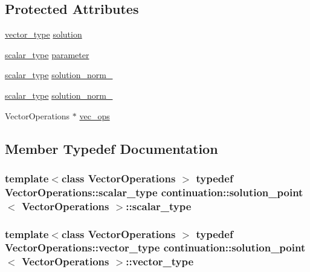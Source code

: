 \subsection*{Protected Attributes}
\begin{DoxyCompactItemize}
\item 
\hyperlink{classcontinuation_1_1solution__point_a6c3692e61ce44b2ac89223c0f6db2895}{vector\-\_\-type} \hyperlink{classcontinuation_1_1solution__point_a931d91bfd44bb22ca33adb05a53cd660}{solution}
\item 
\hyperlink{classcontinuation_1_1solution__point_aa3e601aeccb1c0fd6faebd835f1e92db}{scalar\-\_\-type} \hyperlink{classcontinuation_1_1solution__point_ab5c24bf3e77b6ad2128fb0829954003f}{parameter}
\item 
\hyperlink{classcontinuation_1_1solution__point_aa3e601aeccb1c0fd6faebd835f1e92db}{scalar\-\_\-type} \hyperlink{classcontinuation_1_1solution__point_a1273d8cd06c0249e3e2ed6c174125d35}{solution\-\_\-norm\-\_}
\item 
\hyperlink{classcontinuation_1_1solution__point_aa3e601aeccb1c0fd6faebd835f1e92db}{scalar\-\_\-type} \hyperlink{classcontinuation_1_1solution__point_a553c396c3e822fadec812e5add4d9580}{solution\-\_\-norm\-\_}
\item 
Vector\-Operations $\ast$ \hyperlink{classcontinuation_1_1solution__point_a624bdfc528e737f6baf4529dd61c2885}{vec\-\_\-ops}
\end{DoxyCompactItemize}


\subsection{Member Typedef Documentation}
\hypertarget{classcontinuation_1_1solution__point_aa3e601aeccb1c0fd6faebd835f1e92db}{
\subsubsection[{scalar\-\_\-type}]{\setlength{\rightskip}{0pt plus 5cm}template$<$class Vector\-Operations $>$ typedef Vector\-Operations\-::scalar\-\_\-type {\bf continuation\-::solution\-\_\-point}$<$ Vector\-Operations $>$\-::{\bf scalar\-\_\-type}}}\label{classcontinuation_1_1solution__point_aa3e601aeccb1c0fd6faebd835f1e92db}
\hypertarget{classcontinuation_1_1solution__point_a6c3692e61ce44b2ac89223c0f6db2895}{
\subsubsection[{vector\-\_\-type}]{\setlength{\rightskip}{0pt plus 5cm}template$<$class Vector\-Operations $>$ typedef Vector\-Operations\-::vector\-\_\-type {\bf continuation\-::solution\-\_\-point}$<$ Vector\-Operations $>$\-::{\bf vector\-\_\-type}}}\label{classcontinuation_1_1solution__point_a6c3692e61ce44b2ac89223c0f6db2895}


